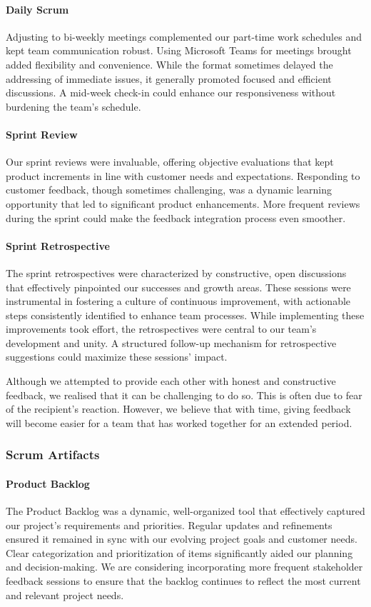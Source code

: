 \paragraph{Daily Scrum}
Adjusting to bi-weekly meetings complemented our part-time work schedules and kept team communication robust.
Using Microsoft Teams for meetings brought added flexibility and convenience.
While the format sometimes delayed the addressing of immediate issues, it generally promoted focused and efficient discussions.
A mid-week check-in could enhance our responsiveness without burdening the team's schedule.

\paragraph{Sprint Review}
Our sprint reviews were invaluable, offering objective evaluations that kept product increments in line with customer needs and expectations.
Responding to customer feedback, though sometimes challenging, was a dynamic learning opportunity that led to significant product enhancements.
More frequent reviews during the sprint could make the feedback integration process even smoother.

\paragraph{Sprint Retrospective}
The sprint retrospectives were characterized by constructive, open discussions that effectively pinpointed our successes and growth areas.
These sessions were instrumental in fostering a culture of continuous improvement, with actionable steps consistently identified to enhance team processes.
While implementing these improvements took effort, the retrospectives were central to our team's development and unity.
A structured follow-up mechanism for retrospective suggestions could maximize these sessions' impact.

Although we attempted to provide each other with honest and constructive feedback, we realised that it can be challenging to do so.
This is often due to fear of the recipient's reaction.
However, we believe that with time, giving feedback will become easier for a team that has worked together for an extended period.

\subsubsection{Scrum Artifacts}

\paragraph{Product Backlog}
The Product Backlog was a dynamic, well-organized tool that effectively captured our project's requirements and priorities.
Regular updates and refinements ensured it remained in sync with our evolving project goals and customer needs.
Clear categorization and prioritization of items significantly aided our planning and decision-making.
We are considering incorporating more frequent stakeholder feedback sessions to ensure that the backlog continues to reflect the most current and relevant project needs.

